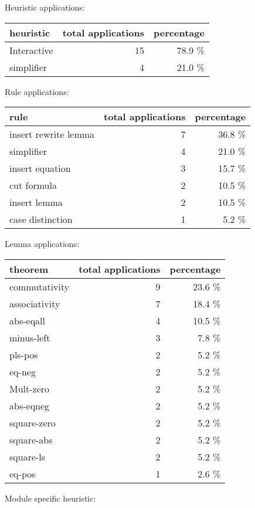 \documentclass[a4paper]{article}
\begin{document}
\medskip


Heuristic applications:

\begin{supertabular}{l|r|r}
heuristic	& total applications & percentage \\ \hline
Interactive & 15 & 78.9 \% \\
simplifier & 4 & 21.0 \% \\

\end{supertabular}

Rule applications:

\begin{supertabular}{l|r|r}
rule	        & total applications & percentage \\ \hline
insert rewrite lemma & 7 & 36.8 \% \\
simplifier & 4 & 21.0 \% \\
insert equation & 3 & 15.7 \% \\
cut formula & 2 & 10.5 \% \\
insert lemma & 2 & 10.5 \% \\
case distinction & 1 & 5.2 \% \\

\end{supertabular}

Lemma applications:

\begin{supertabular}{l|r|r}
theorem	        & total applications & percentage \\ \hline
commutativity & 9 & 23.6 \% \\
associativity & 7 & 18.4 \% \\
abs-eqall & 4 & 10.5 \% \\
minus-left & 3 & 7.8 \% \\
pls-pos & 2 & 5.2 \% \\
eq-neg & 2 & 5.2 \% \\
Mult-zero & 2 & 5.2 \% \\
abs-eqneg & 2 & 5.2 \% \\
square-zero & 2 & 5.2 \% \\
square-abs & 2 & 5.2 \% \\
square-ls & 2 & 5.2 \% \\
eq-pos & 1 & 2.6 \% \\

\end{supertabular}

Module specific heuristic:

\pagebreak
\end{document}
